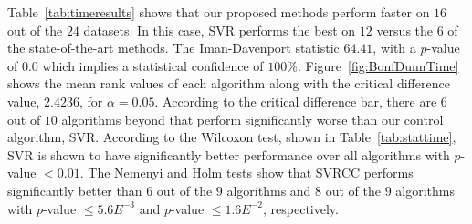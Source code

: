 \documentclass[reqno]{vcuthesis}
\numberwithin{equation}{chapter}
\begin{document}
\begin{table}[t!]
{}\vspace{-1em}
\label{fig:BonfDunnTime}\vspace{-1.5em}
\label{tab:stattime}
\scriptsize
{}
\end{table}
Table~{\ref{tab:timeresults}} shows that our proposed methods perform faster on $16$ out of the $24$ datasets. In this case, SVR performs the best on $12$ versus the $6$ of the state-of-the-art methods. The Iman-Davenport statistic $64.41$, with a $p$-value of $0.0$ which implies a statistical confidence of $100\%$. Figure~{\ref{fig:BonfDunnTime}} shows the mean rank values of each algorithm along with the critical difference value, $2.4236$, for $\alpha = 0.05$. According to the critical difference bar, there are $6$ out of $10$ algorithms beyond that perform significantly worse than our control algorithm, SVR.
According to the Wilcoxon test, shown in Table~{\ref{tab:stattime}}, SVR is shown to have significantly better performance over all algorithms with $p$-value $< 0.01$. The Nemenyi and Holm tests show that SVRCC performs significantly better than $6$ out of the $9$ algorithms and $8$ out of the $9$ algorithms with $p$-value $\leq 5.6E^{-3}$ and $p$-value $\leq 1.6E^{-2}$, respectively.
\end{document}
